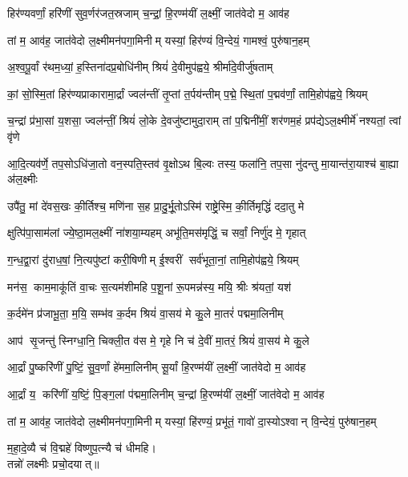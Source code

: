 

\twolineshloka
{हिर॑ण्यवर्णां॒ हरि॑णीं सुव॒र्णर॑जत॒स्रजाम्}%
{च॒न्द्रां॒ हि॒रण्म॑यीं ल॒क्ष्मीं॒ जात॑वेदो म॒ आव॑ह}%

\twolineshloka
{तां म॒ आव॑ह॒ जात॑वेदो ल॒क्ष्मीमन॑पगा॒मिनीम्}%
{यस्यां॒ हिर॑ण्यं वि॒न्देयं॒ गामश्वं॒ पुरु॑षान॒हम्}%

\twolineshloka
{अ॒श्व॒पू॒र्वां र॑थम॒ध्यां॒ ह॒स्तिना॑दप्र॒बोधि॑नीम्}%
{श्रियं॑ दे॒वीमुप॑ह्वये॒ श्रीर्मा॑दे॒वीर्जु॑षताम्}%

\twolineshloka
{कां॒ सो॒\aav{}स्मि॒तां हिर॑ण्यप्राकारामा॒र्द्रां ज्वल॑न्तीं तृ॒प्तां त॒र्पय॑न्तीम्}%
{प॒द्मे॒ स्थि॒तां प॒द्मव॑र्णां॒ तामि॒होप॑ह्वये॒ श्रियम्}%

\twolineshloka
{च॒न्द्रां प्र॑भा॒सां य॒शसा॒ ज्वल॑न्तीं॒ श्रियं॑ लो॒के दे॒वजु॑ष्टामुदा॒राम्}%
{तां प॒द्मिनी॑मीं॒ शर॑णम॒हं प्रप॑द्येऽल॒क्ष्मीर्मे॑ नश्यतां॒ त्वां वृ॑णे}%

\twolineshloka
{आ॒दि॒त्यव॑र्णे॒ तप॒सोऽधि॑जा॒तो वन॒स्पति॒स्तव॑ वृ॒क्षोऽथ बि॒ल्वः}%
{तस्य॒ फला॑नि॒ तप॒सा नु॑दन्तु मा॒यान्त॑रा॒याश्च॑ बा॒ह्या अ॑ल॒क्ष्मीः}%

\twolineshloka
{उपै॑तु॒ मां दे॑वस॒खः की॒र्तिश्च॒ मणि॑ना स॒ह}%
{प्रा॒दु॒र्भू॒तोऽस्मि॑ राष्ट्रे॒\aav{}स्मि॒\an{} की॒र्तिमृद्धिं॑ ददा॒तु मे}%

\twolineshloka
{क्षुत्पि॑पा॒साम॑लां ज्ये॒ष्ठा॒मल॒क्ष्मीं ना॑शया॒म्यहम्}%
{अभू॑ति॒मस॑मृद्धिं॒ च सर्वां॒ निर्णु॑द मे॒ गृहात्}%

\twolineshloka
{ग॒न्ध॒द्वा॒रां दु॑राध॒\ar{}षां॒ नि॒त्यपु॑ष्टां करी॒षिणीम्}%
{ई॒श्वरीं सर्व॑भूता॒नां॒ तामि॒होप॑ह्वये॒ श्रियम्}%

\twolineshloka
{मन॑स॒ काम॒माकू॑तिं वा॒चः स॒त्यम॑शीमहि}%
{प॒शू॒नां रू॒पमन्न॑स्य॒ मयि॒ श्रीः श्र॑यतां॒ यश॑}%

\twolineshloka
{क॒र्दमे॑न प्र॑जाभू॒ता॒ म॒यि॒ सम्भ॑व क॒र्दम}%
{श्रियं॑ वा॒सय॑ मे कु॒ले मा॒तरं॑ पद्ममा॒लिनीम्}%

\twolineshloka
{आप॑ सृ॒जन्तु॑ स्निग्धा॒नि॒ चिक्ली॒त व॑स मे॒ गृहे}%
{नि च॑ दे॒वीं मा॒तरं॒ श्रियं॑ वा॒सय॑ मे कु॒ले}%

\twolineshloka
{आ॒र्द्रां पु॒ष्करि॑णीं पु॒ष्टिं॒ सु॒व॒र्णां हे॑ममा॒लिनीम्}%
{सू॒र्यां हि॒रण्म॑यीं ल॒क्ष्मीं॒ जात॑वेदो म॒ आव॑ह}%

\twolineshloka
{आ॒र्द्रां य॒ करि॑णीं य॒ष्टिं॒ पि॒ङ्ग॒लां प॑द्ममा॒लिनीम्}%
{च॒न्द्रां हि॒रण्म॑यीं ल॒क्ष्मीं॒ जात॑वेदो म॒ आव॑ह}%

\twolineshloka
{तां म॒ आव॑ह॒ जात॑वेदो ल॒क्ष्मीमन॑पगा॒मिनीम्}%
{यस्यां॒ हि॑रण्यं॒ प्रभू॑तं॒ गावो॑ दा॒स्योऽश्वान् वि॒न्देयं॒ पुरु॑षान॒हम्}%
\begin{center}
{म॒हा॒दे॒व्यै च॑ वि॒द्महे॑ विष्णुप॒त्न्यै च॑ धीमहि।\\
तन्नो॑ लक्ष्मीः प्रचो॒दयात्॥}
\end{center}